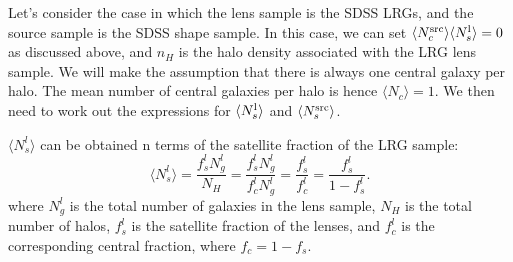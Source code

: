 \documentclass[onecolumn,amsmath,aps,fleqn, superscriptaddress]{revtex4}
\begin{document}
Let's consider the case in which the lens sample is the SDSS LRGs, and the source sample is the SDSS shape sample. In this case, we can set $\langle N_c^{\rm src}\rangle \langle N_s^{\rm l} \rangle=0$ as discussed above, and $n_H$ is the halo density associated with the LRG lens sample. We will make the assumption that there is always one central galaxy per halo. The mean number of central galaxies per halo is hence $\langle N_c \rangle=1$. We then need to work out the expressions for $\langle N_s^{\rm l} \rangle$ and $\langle N_s^{\rm src} \rangle$.

$\langle N_s^l \rangle$ can be obtained n terms of the satellite fraction of the LRG sample:
\begin{equation}
\langle N_s^l \rangle = \frac{f_s^l N_g^l}{N_H} = \frac{f_s^l N_g^l}{f_c^l N_g^l} = \frac{f_s^l}{f_c^l} = \frac{f_s^l}{1-f_s^l}.
\label{Nsmean_lens}
\end{equation}
where $N_g^l$ is the total number of galaxies in the lens sample, $N_H$ is the total number of halos, $f_s^l$ is the satellite fraction of the lenses, and $f_c^l$ is the corresponding central fraction, where $f_c=1-f_s$.
\end{document}
